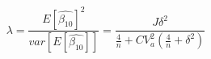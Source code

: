 \begin{equation}
\label{eq:lambda}
\lambda = \frac{E[\hat{\beta_{10}}]^2}{var[E[\hat{\beta_{10}}]]} = \frac{J\delta^2}{\frac{4}{n}+CV_{a}^2(\frac{4}{n} + \delta^2)}
\end{equation}